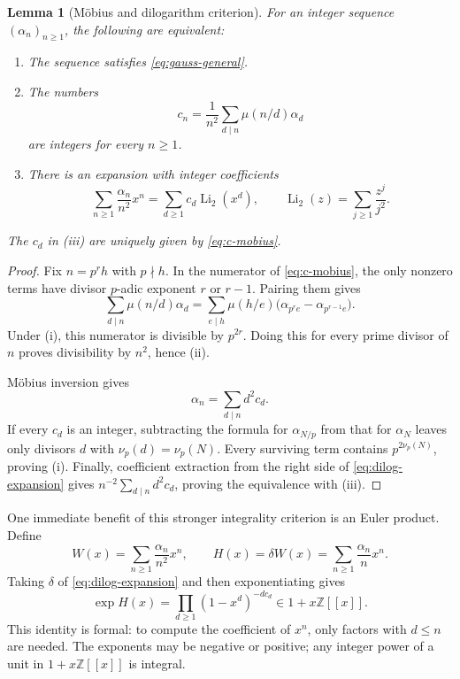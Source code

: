 \documentclass[11pt,letterpaper]{article}
\numberwithin{equation}{section}
\newtheorem{lemma}[theorem]{Lemma}
\theoremstyle{definition}
\newcommand{\Z}{\mathbb Z}
\newcommand{\dd}{\delta}
\newcommand{\Li}{\operatorname{Li}}
\begin{document}
\begin{lemma}[M\"obius and dilogarithm criterion]\label{lem:mobius}
For an integer sequence $(\alpha_n)_{n\geq1}$, the following are
equivalent:
\begin{enumerate}[label=\textup{(\roman*)}]
\item The sequence satisfies \eqref{eq:gauss-general}.
\item The numbers
\begin{equation}\label{eq:c-mobius}
c_n=\frac1{n^2}\sum_{d\mid n}\mu(n/d)\alpha_d
\end{equation}
are integers for every $n\geq1$.
\item There is an expansion with integer coefficients
\begin{equation}\label{eq:dilog-expansion}
\sum_{n\geq1}\frac{\alpha_n}{n^2}x^n
=\sum_{d\geq1}c_d\Li_2(x^d),
\qquad \Li_2(z)=\sum_{j\geq1}\frac{z^j}{j^2}.
\end{equation}
\end{enumerate}
The $c_d$ in \textup{(iii)} are uniquely given by \eqref{eq:c-mobius}.
\end{lemma}

\begin{proof}
Fix $n=p^rh$ with $p\nmid h$. In the numerator of
\eqref{eq:c-mobius}, the only nonzero terms have divisor $p$-adic
exponent $r$ or $r-1$. Pairing them gives
\[
\sum_{d\mid n}\mu(n/d)\alpha_d
=\sum_{e\mid h}\mu(h/e)
 \bigl(\alpha_{p^re}-\alpha_{p^{r-1}e}\bigr).
\]
Under (i), this numerator is divisible by $p^{2r}$. Doing this for every
prime divisor of $n$ proves divisibility by $n^2$, hence (ii).

M\"obius inversion gives
\begin{equation}\label{eq:divisor-recovery}
\alpha_n=\sum_{d\mid n}d^2c_d.
\end{equation}
If every $c_d$ is an integer, subtracting the formula for
$\alpha_{N/p}$ from that for $\alpha_N$ leaves only divisors $d$ with
$\nu_p(d)=\nu_p(N)$. Every surviving term contains
$p^{2\nu_p(N)}$, proving (i). Finally, coefficient extraction from the
right side of \eqref{eq:dilog-expansion} gives
$n^{-2}\sum_{d\mid n}d^2c_d$, proving the equivalence with (iii).
\end{proof}

One immediate benefit of this stronger integrality criterion is an Euler
product. Define
\[
W(x)=\sum_{n\geq1}\frac{\alpha_n}{n^2}x^n,
\qquad H(x)=\dd W(x)=\sum_{n\geq1}\frac{\alpha_n}{n}x^n.
\]
Taking $\dd$ of \eqref{eq:dilog-expansion} and then exponentiating gives
\begin{equation}\label{eq:euler}
\exp H(x)=\prod_{d\geq1}(1-x^d)^{-d c_d}
\in1+x\Z[[x]].
\end{equation}
This identity is formal: to compute the coefficient of $x^n$, only
factors with $d\leq n$ are needed. The exponents may be negative or
positive; any integer power of a unit in $1+x\Z[[x]]$ is integral.
\end{document}

